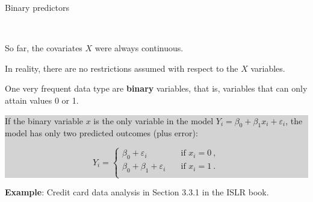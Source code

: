 \documentclass[10pt,ignorenonframetext,]{beamer}
\begin{document}
\begin{frame}

\begin{block}{Binary predictors}

\(~\)

So far, the covariates \(X\) were always continuous.\\
\vspace{2mm}

In reality, there are no restrictions assumed with respect to the \(X\)
variables. \vspace{2mm}

One very frequent data type are \textbf{binary} variables, that is,
variables that can only attain values 0 or 1. \vspace{4mm}

\colorbox{lightgray}{\begin{minipage}{10cm}
If the binary variable $x$ is the only variable in the model $Y_i = \beta_0 + \beta_1 x_i + \varepsilon_i$, the model has only two predicted outcomes (plus error):

\begin{equation*}
Y_i = \left\{ 
\begin{array}{ll}
 \beta_0  + \varepsilon_i \quad &\text{if } x_i=0 \ , \\
 \beta_0 + \beta_1 + \varepsilon_i \quad &\text{if } x_i =1 \ .\\
\end{array}
\right .
\end{equation*}
\end{minipage}}

\textbf{Example}: Credit card data analysis in Section 3.3.1 in the ISLR
book.

\end{block}

\end{frame}
\end{document}
